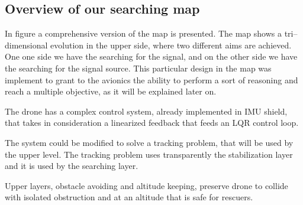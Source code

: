 \subsection{Overview of our searching map}
In figure  a comprehensive version of the map is presented. The map shows a tri--dimensional evolution in the upper side, where two different aims are achieved. One one side we have the searching for the signal, and on the other side we have the searching for the signal source. This particular design in the map was implement to grant to the avionics the ability to perform a sort of reasoning and reach a multiple objective, as it will be explained later on.

The drone has a complex control system, already implemented in IMU shield, that takes in consideration a linearized feedback that feeds an LQR control loop. 

The system could be modified to solve a tracking problem, that will be used by the upper level. The tracking problem uses transparently the stabilization layer and it is used by the searching layer.

Upper layers, obstacle avoiding and altitude keeping, preserve drone to collide with isolated obstruction and at an altitude that is safe for rescuers. 
